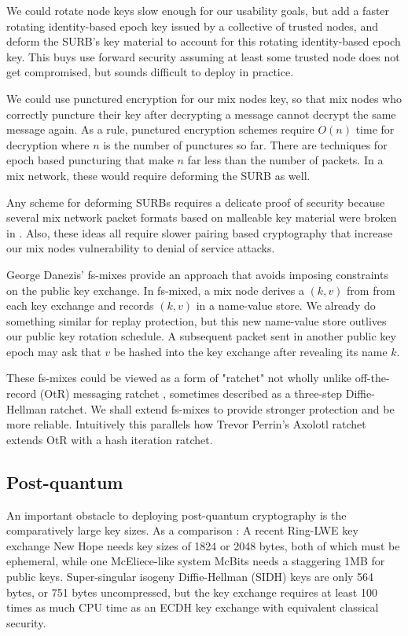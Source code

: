 \documentclass[twoside,letterpaper]{llncs}
\begin{document}
We could rotate node keys slow enough for our usability goals, but add
a faster rotating identity-based epoch key issued by a collective of
trusted nodes, and deform the SURB's key material to account for this
rotating identity-based epoch key.  This buys use forward security
assuming at least some trusted node does not get compromised, but
sounds difficult to deploy in practice. 

We could use punctured encryption \cite{libforwardsec} for our
mix nodes key, so that mix nodes who correctly puncture their key
after decrypting a message cannot decrypt the same message again. 
As a rule, punctured encryption schemes require $O(n)$ time for
decryption where $n$ is the number of punctures so far.  There are
techniques for epoch based puncturing that make $n$ far less than
the number of packets.  In a mix network, these would require
deforming the SURB as well. 

Any scheme for deforming SURBs requires a delicate proof of security
because several mix network packet formats based on malleable key
material were broken in \cite{Danezis2006}. 
Also, these ideas all require slower pairing based cryptography that
increase our mix nodes vulnerability to denial of service attacks. 

George Danezis' fs-mixes \cite{fs-mix} provide an approach that
avoids imposing constraints on the public key exchange.  In fs-mixed,
a mix node derives a $(k,v)$ from from each key exchange and records
$(k,v)$  in a name-value store.  We already do something similar for 
replay protection, but this new name-value store outlives our public
key rotation schedule.  A subsequent packet sent in another public
key epoch may ask that $v$ be hashed into the key exchange after
revealing its name $k$.  

These fs-mixes could be viewed as a form of "ratchet" not wholly
unlike off-the-record (OtR) messaging ratchet \cite{OtR},
sometimes described as a three-step Diffie-Hellman ratchet.  
We shall extend fs-mixes to provide stronger protection and be more
reliable.  Intuitively this parallels how Trevor Perrin's Axolotl 
ratchet extends OtR with a hash iteration ratchet. 

\subsection{Post-quantum}

An important obstacle to deploying post-quantum cryptography is
the comparatively large key sizes.  As a comparison : 
%
A recent Ring-LWE key exchange New Hope \cite[\S7, p.10]{NewHope} needs
 key sizes of 1824 or 2048 bytes, both of which must be ephemeral,
while one McEliece-like system McBits %
 needs a staggering 1MB for public keys.
%
Super-singular isogeny Diffie-Hellman (SIDH) \cite[p. 21]{SIDH-2016} keys
are only 564 bytes, or 751 bytes uncompressed, but
 the key exchange requires at least 100 times as much CPU time as
 an ECDH key exchange with equivalent classical security.
\end{document}
